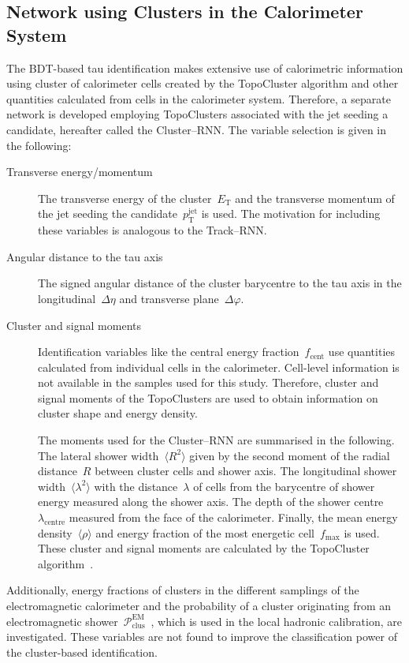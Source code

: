 
\subsection{Network using Clusters in the Calorimeter System}
\label{sec:rnn_clusters}

The BDT-based tau identification makes extensive use of calorimetric information
using cluster of calorimeter cells created by the TopoCluster algorithm and
other quantities calculated from cells in the calorimeter system. Therefore, a
separate network is developed employing TopoClusters associated with the jet
seeding a \tauhadvis candidate, hereafter called the Cluster--RNN. The variable
selection is given in the following:
\begin{description}
\item[Transverse energy/momentum] The transverse energy of the
  cluster~$E_\text{T}$ and the transverse momentum of the jet seeding the
  \tauhadvis candidate~$p_\text{T}^\text{jet}$ is used. The motivation for
  including these variables is analogous to the Track--RNN.

\item[Angular distance to the tau axis] The signed angular distance of the
  cluster barycentre to the tau axis in the longitudinal~$\Delta \eta$ and
  transverse plane~$\Delta \varphi$.

\item[Cluster and signal moments] Identification variables like the central
  energy fraction~$f_\text{cent}$ use quantities calculated from individual
  cells in the calorimeter. Cell-level information is not available in the
  samples used for this study. Therefore, cluster and signal moments of the
  TopoClusters are used to obtain information on cluster shape and energy
  density.

  The moments used for the Cluster--RNN are summarised in the following. The
  lateral shower width~$\langle R^2 \rangle$ given by the second moment of the
  radial distance~$R$ between cluster cells and shower axis. The longitudinal
  shower width~$\langle \lambda^2 \rangle$ with the distance~$\lambda$ of cells
  from the barycentre of shower energy measured along the shower axis. The depth
  of the shower centre~$\lambda_\text{centre}$ measured from the face of the
  calorimeter. Finally, the mean energy density~$\langle \rho \rangle$ and
  energy fraction of the most energetic cell~$f_\text{max}$ is used. These
  cluster and signal moments are calculated by the TopoCluster
  algorithm~\cite{atlas_topoclustering}.
\end{description}
Additionally, energy fractions of clusters in the different samplings of the
electromagnetic calorimeter and the probability of a cluster originating from an
electromagnetic
shower~$\mathcal{P}_\text{clus}^\text{EM}$~\cite{atlas_topoclustering}, which is
used in the local hadronic calibration, are investigated. These variables are
not found to improve the classification power of the cluster-based
identification.

